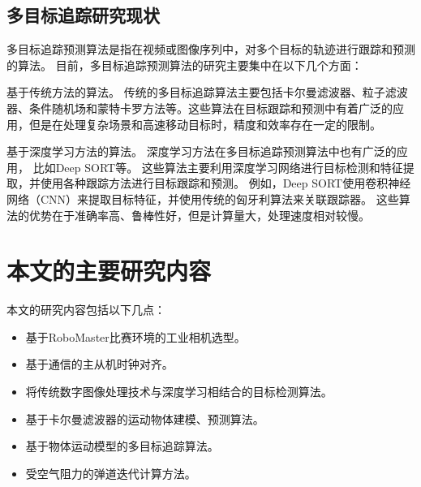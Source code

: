 \subsection{多目标追踪研究现状}
多目标追踪预测算法是指在视频或图像序列中，对多个目标的轨迹进行跟踪和预测的算法。
目前，多目标追踪预测算法的研究主要集中在以下几个方面：
\par
基于传统方法的算法。
传统的多目标追踪算法主要包括卡尔曼滤波器、粒子滤波器、条件随机场和蒙特卡罗方法等。这些算法在目标跟踪和预测中有着广泛的应用，但是在处理复杂场景和高速移动目标时，精度和效率存在一定的限制。
\par
基于深度学习方法的算法。
深度学习方法在多目标追踪预测算法中也有广泛的应用\cite{xu2019deep}，
比如Deep SORT\cite{wojke2017simple}等。
这些算法主要利用深度学习网络进行目标检测和特征提取，并使用各种跟踪方法进行目标跟踪和预测。
例如，Deep SORT使用卷积神经网络（CNN）来提取目标特征，并使用传统的匈牙利算法来关联跟踪器。
这些算法的优势在于准确率高、鲁棒性好，但是计算量大，处理速度相对较慢。
\par



\section{本文的主要研究内容}
本文的研究内容包括以下几点：
\begin{itemize}[itemindent=2em]
    \item 基于RoboMaster比赛环境的工业相机选型。
    \item 基于通信的主从机时钟对齐。
    \item 将传统数字图像处理技术与深度学习相结合的目标检测算法。
    \item 基于卡尔曼滤波器的运动物体建模、预测算法。
    \item 基于物体运动模型的多目标追踪算法。
    \item 受空气阻力的弹道迭代计算方法。
\end{itemize}





